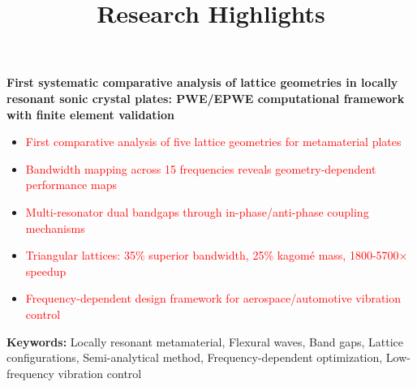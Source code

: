 \documentclass[11pt]{article}
\title{\textbf{Research Highlights}}
\author{}
\date{}
\begin{document}
\maketitle

\vspace{-1cm}

\textbf{First systematic comparative analysis of lattice geometries in locally resonant sonic crystal plates: PWE/EPWE computational framework with finite element validation}

\vspace{0.5cm}

\begin{itemize}[leftmargin=0.5cm, itemsep=0.3cm]

\item \textcolor{red}{First comparative analysis of five lattice geometries for metamaterial plates}

\item \textcolor{red}{Bandwidth mapping across 15 frequencies reveals geometry-dependent performance maps}

\item \textcolor{red}{Multi-resonator dual bandgaps through in-phase/anti-phase coupling mechanisms}

\item \textcolor{red}{Triangular lattices: 35\% superior bandwidth, 25\% kagomé mass, 1800-5700× speedup}

\item \textcolor{red}{Frequency-dependent design framework for aerospace/automotive vibration control}

\end{itemize}

\vspace{0.5cm}

\textbf{Keywords:} Locally resonant metamaterial, Flexural waves, Band gaps, Lattice configurations, Semi-analytical method, Frequency-dependent optimization, Low-frequency vibration control
\end{document}
